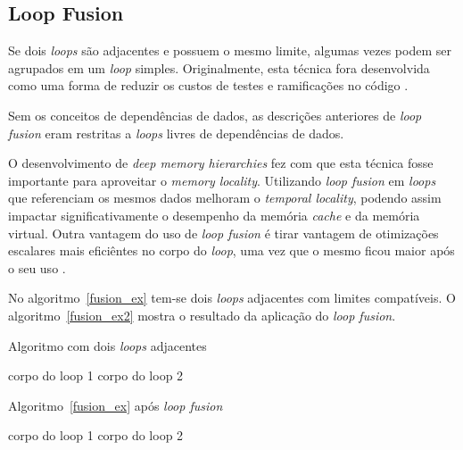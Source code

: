 
\subsection{Loop Fusion}

Se dois \textit{loops} são adjacentes e possuem o mesmo limite, algumas vezes
podem ser agrupados em um \textit{loop} simples.
Originalmente, esta técnica fora desenvolvida como uma forma de reduzir os
custos de testes e ramificações no código \cite{Wolf:1996}.

Sem os conceitos de dependências de dados, as descrições anteriores de
\textit{loop fusion} eram restritas a \textit{loops} livres de dependências de
dados. 

O desenvolvimento de \textit{deep memory hierarchies} fez com que esta técnica
fosse importante para aproveitar o \textit{memory locality}.
Utilizando \textit{loop fusion} em \textit{loops} que referenciam os mesmos
dados melhoram o \textit{temporal locality}, podendo assim impactar 
significativamente o desempenho da memória \textit{cache} e da memória virtual.
Outra vantagem do uso de \textit{loop fusion} é tirar vantagem de otimizações 
escalares mais eficiêntes no corpo do \textit{loop}, uma vez que o mesmo ficou
maior após o seu uso \cite{McKinley:1996}.

No algoritmo~\ref{fusion_ex} tem-se dois \textit{loops} adjacentes com limites
compatíveis. 
O algoritmo~\ref{fusion_ex2} mostra o resultado da aplicação do 
\textit{loop fusion}.

\begin{algorithm}
\caption{Algoritmo com dois \textit{loops} adjacentes}
\label{fusion_ex}
\begin{algorithmic}[1]

\STATE corpo do loop 1
\ENDFOR
{}
\STATE corpo do loop 2
\ENDFOR

\end{algorithmic}
\end{algorithm}

\begin{algorithm}
\caption{Algoritmo~\ref{fusion_ex} após \textit{loop fusion}}
\label{fusion_ex2}
\begin{algorithmic}[1]

\STATE corpo do loop 1
\STATE corpo do loop 2
\ENDFOR

\end{algorithmic}
\end{algorithm}

